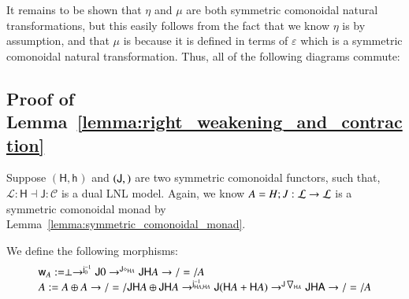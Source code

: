 \documentclass{lmcs}
\let\mto\to
\let\to\relax
\newcommand{\to}{\rightarrow}
\let\r\relax
\let\c\relax
\let\j\relax
\let\wn\relax
\newcommand{\cat}[1]{\mathcal{#1}}
\newcommand{\func}[1]{\mathsf{#1}}
\newcommand{\h}[1]{\mathsf{h}_{#1}}
\newcommand{\r}[1]{\mathsf{r}_{#1}}
\newcommand{\w}[1]{\mathsf{w}_{#1}}
\newcommand{\c}[1]{\mathsf{c}_{#1}}
\newcommand{\j}[1]{\mathsf{j}_{#1}}
\newcommand{\jinv}[1]{\mathsf{j}^{-1}_{#1}}
\newcommand{\wn}[0]{\mathop{?}}
\newcommand{\codiag}[1]{\bigtriangledown_{#1}}
\begin{document}
It remains to be shown that $\eta$ and $\mu$ are both
symmetric comonoidal natural transformations, but this easily follows
from the fact that we know $\eta$ is by assumption, and that $\mu$
is because it is defined in terms of $\varepsilon$ which is a
symmetric comonoidal natural transformation.  Thus, all of the
following diagrams commute:

\subsection{Proof of Lemma~\ref{lemma:right_weakening_and_contraction}}
\label{subsec:proof_of_lemma:right_weakening_and_contraction}
Suppose $(\func{H},\h{})$ and $(\func{J},\j{})$ are two symmetric
comonoidal functors, such that, $\cat{L} : \func{H} \dashv \func{J}
: \cat{C}$ is a dual LNL model.  Again, we know $\wn A = H;J : \cat{L}
\mto \cat{L}$ is a symmetric comonoidal monad by
Lemma~\ref{lemma:symmetric_comonoidal_monad}.  

We define the following morphisms:
\[
\begin{array}{lll}
  \w{A} := \perp \mto^{\jinv{0}} \func{J} 0 \mto^{\func{J}\diamond_{\func{H} A}} \func{JH}A \mto/=/ \wn A\\
  \c{A} := \wn A \oplus \wn A \mto/=/ \func{JH}A \oplus \func{JH}A \mto^{\jinv{\func{H}A,\func{H}A}} \func{J}(\func{H}A + \func{H}A) \mto^{\func{J}\codiag{\func{H}A}} \func{JHA} \mto/=/ \wn A
\end{array}
\]
\end{document}

